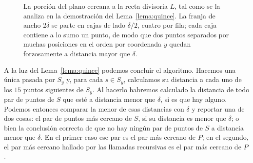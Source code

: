 \documentclass[12pt, spanish, oneside, openany]{book}
\theoremstyle{uprightplain}
\theoremstyle{definition}
\theoremstyle{remark}
\theoremstyle{definition}
\begin{document}
\begin{figure}[H]
\centering
{}
\caption{La porción del plano cercana a la recta divisoria $L$, tal como se la
analiza en la demostración del Lema~\ref{lema:quince}. La franja de ancho
$2\delta$ se parte en cajas de lado $\delta/2$, cuatro por fila; cada caja
contiene a lo sumo un punto, de modo que dos puntos separados por muchas
posiciones en el orden por coordenada $y$ quedan forzosamente a distancia mayor
que $\delta$.}
\label{fig:cajas}
\end{figure}

A la luz del Lema~\ref{lema:quince} podemos concluir el algoritmo. Hacemos una única pasada por $S_y$ y, para cada $s\in S_y$, calculamos su distancia a cada uno de los $15$ puntos siguientes de $S_y$. Al hacerlo habremos calculado la distancia de todo par de puntos de $S$ que esté a distancia menor que $\delta$, si es que hay alguno. Podemos entonces comparar la menor de esas distancias con $\delta$ y reportar una de dos cosas: el par de puntos más cercano de $S$, si su distancia es menor que $\delta$; o bien la conclusión correcta de que no hay ningún par de puntos de $S$ a distancia menor que $\delta$. En el primer caso ese par es el par más cercano de $P$; en el segundo, el par más cercano hallado por las llamadas recursivas es el par más cercano de $P$.
\end{document}
